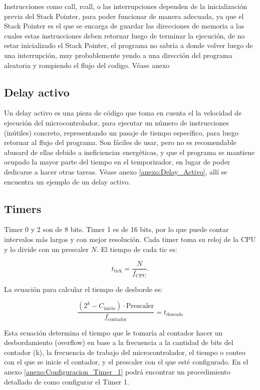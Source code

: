 Instrucciones como call, rcall, o las interrupciones dependen de la inicialización previa del Stack Pointer, para poder funcionar de manera adecuada, ya que el Stack Pointer es el que se encarga de guardar las direcciones de memoria a las cuales estas instrucciones deben retornar luego de terminar la ejecución, de no estar inicializado el Stack Pointer, el programa no sabría a donde volver luego de una interrupción, muy probablemente yendo a una dirección del programa aleatoria y rompiendo el flujo del codigo. Véase anexo 

\subsection{Delay activo}
Un delay activo es una pieza de código que toma en cuenta el la velocidad de ejecución del microcontrolador, para ejecutar un número de instrucciones (inútiles) concreto, representando un pasaje de tiempo específico, para luego retornar al flujo del programa. Son fáciles de usar, pero no es recomendable abusard de ellas debido a ineficiencias energéticas, y que el programa se mantiene ocupado la mayor parte del tiempo en el temporizador, en lugar de poder dedicarse a hacer otras tareas. Véase anexo \ref{anexo:Delay_Activo}, allí se encuentra un ejemplo de un delay activo.

\subsection{Timers}
Timer 0 y 2 son de 8 bits. Timer 1 es de 16 bits, por lo que puede contar intervalos más largos y con mejor resolución. Cada timer toma su reloj de la CPU y lo divide con un prescaler \(N\). El tiempo de cada tic es:

\[
t_{\text{tick}}=\frac{N}{f_{\text{CPU}}}.
\]

La ecuación para calcular el tiempo de desborde es:

\[
    \frac{(2^{k} - C_{\text{inicio}})\cdot \text{Prescaler}}{f_{\text{contador}}} = t_{\text{deseado}}
\]


Esta ecuación determina el tiempo que le tomaría al contador hacer un desbordamiento (overflow) en base a la frecuencia a la cantidad de bits del contador (k), la frecuencia de trabajo del microcontrolador, el tiempo o conteo con el que se inicie el contador, y el prescaler con el que esté configurado. En el anexo \ref{anexo:Configuracion_Timer_1} podrá encontrar un procedimiento detallado de como configurar el Timer 1.

